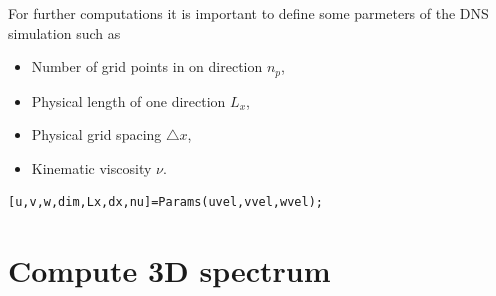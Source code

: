\documentclass[ntfdMod]{elsarticle}
\begin{document}
\begin{par}

For further computations it is important to define some parmeters of the
DNS simulation such as
\begin{itemize}
  \item Number of grid points in on direction $n_{p}$,
  \item Physical length of one direction $L_x$,
  \item Physical grid spacing $\triangle x$,
  \item Kinematic viscosity $\nu$.
\end{itemize}

\end{par} \vspace{1em}
\begin{lstlisting}
[u,v,w,dim,Lx,dx,nu]=Params(uvel,vvel,wvel);
\end{lstlisting}
\begin{par}



\end{par} \vspace{1em}


\section{Compute 3D spectrum}
\end{document}
